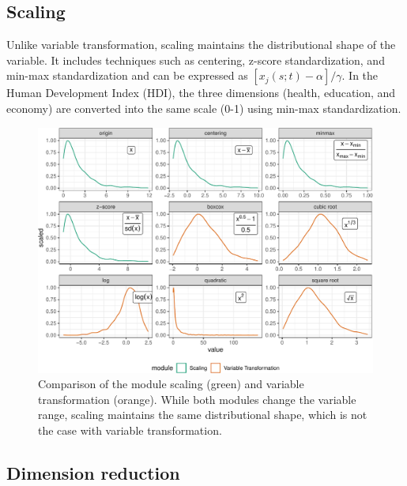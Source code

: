 \documentclass[
]{interact}
\begin{document}
\hypertarget{scaling}{%
\subsection{Scaling}\label{scaling}}

Unlike variable transformation, scaling maintains the distributional
shape of the variable. It includes techniques such as centering, z-score
standardization, and min-max standardization and can be expressed as
\([x_{j}(s;t) - \alpha]/\gamma\). In the Human Development Index (HDI),
the three dimensions (health, education, and economy) are converted into
the same scale (0-1) using min-max standardization.

\begin{figure}

{\centering \includegraphics{tidyindex_files/figure-pdf/fig-scale-var-trans-compare-1.pdf}

}

\caption{\label{fig-scale-var-trans-compare}Comparison of the module
scaling (green) and variable transformation (orange). While both modules
change the variable range, scaling maintains the same distributional
shape, which is not the case with variable transformation.}

\end{figure}

\hypertarget{dimension-reduction}{%
\subsection{Dimension reduction}\label{dimension-reduction}}
\end{document}
